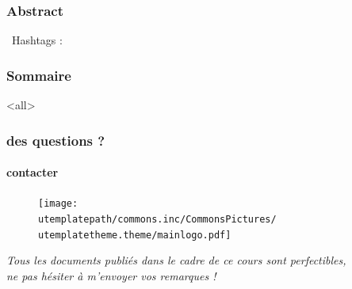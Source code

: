 \begin{frame}
	\frametitle{Abstract}
	\begin{techworkin} [righthand width=.8\textwidth]{\faCogs~\small {Hashtags} : \ukeywords}\uabstract
	\end{techworkin}
	\end{frame}

\begin{frame}
 \frametitle{Sommaire}
      \begin{multicols}{2}
         \tableofcontents[hideallsubsections]
     \end{multicols}
 \end{frame}

\mode<all>{\ubody}

\begin{frame}
 \frametitle{des questions ?}
  \framesubtitle{contacter \umaila}
  					\begin{figure}
  					 \centering
   						 \texttt{[image: \\utemplatepath/commons.inc/CommonsPictures/\\utemplatetheme.theme/mainlogo.pdf]}\\
				  \end{figure}
				 	 \centering \textit{Tous les documents publiés dans le cadre de ce cours sont perfectibles, \\ne pas hésiter à m'envoyer vos remarques !}
 \end{frame}

